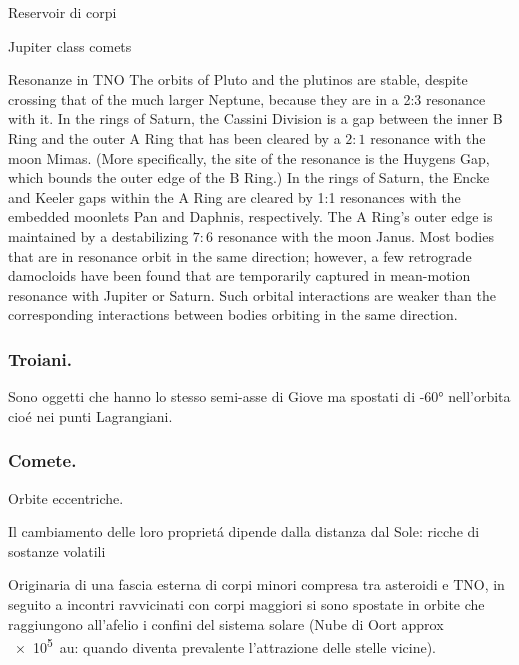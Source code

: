 \begin{frame}{Reservoir di corpi}

\end{frame}

\begin{wordonframe}{Jupiter class comets}

\end{wordonframe}

\begin{frame}{Resonanze in TNO}
The orbits of Pluto and the plutinos are stable, despite crossing that of the much larger Neptune, because they are in a 2:3 resonance with it.
In the rings of Saturn, the Cassini Division is a gap between the inner B Ring and the outer A Ring that has been cleared by a $2:1$ resonance with the moon Mimas. (More specifically, the site of the resonance is the Huygens Gap, which bounds the outer edge of the B Ring.)
    In the rings of Saturn, the Encke and Keeler gaps within the A Ring are cleared by 1:1 resonances with the embedded moonlets Pan and Daphnis, respectively. The A Ring's outer edge is maintained by a destabilizing $7:6$ resonance with the moon Janus.
Most bodies that are in resonance orbit in the same direction; however, a few retrograde damocloids have been found that are temporarily captured in mean-motion resonance with Jupiter or Saturn. Such orbital interactions are weaker than the corresponding interactions between bodies orbiting in the same direction.
\end{frame}

\subsubsection{Troiani.}

Sono oggetti che hanno lo stesso semi-asse di Giove ma spostati di \ang{+-60} nell'orbita cio\'e nei punti Lagrangiani.

\subsubsection{Comete.}
Orbite eccentriche.

Il cambiamento delle loro propriet\'a dipende dalla distanza dal Sole: ricche di sostanze volatili

Originaria di una fascia esterna di corpi minori compresa tra asteroidi e TNO, in seguito a incontri ravvicinati con corpi maggiori si sono spostate in orbite che raggiungono all'afelio i confini del sistema solare (Nube di Oort approx \SI{e5}{\astronomicalunit}: quando diventa prevalente l'attrazione delle stelle vicine).

